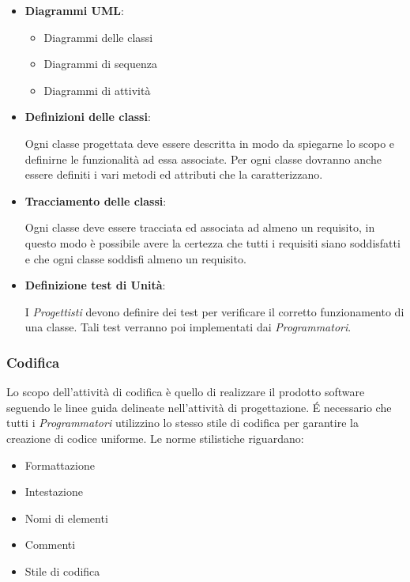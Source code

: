 \begin{itemize}
\item \textbf{Diagrammi UML}:
  \begin{itemize}
  \item Diagrammi delle classi
  \item Diagrammi di sequenza
  \item Diagrammi di attività
  \end{itemize}
\item \textbf{Definizioni delle classi}:

  Ogni classe progettata deve essere descritta in modo da spiegarne lo
  scopo e definirne le funzionalità ad essa associate. Per ogni classe
  dovranno anche essere definiti i vari metodi ed attributi che la
  caratterizzano. 

\item \textbf{Tracciamento delle classi}:

  Ogni classe deve essere tracciata ed associata ad almeno un
  requisito, in questo modo è possibile avere la certezza che tutti i
  requisiti siano soddisfatti e che ogni classe soddisfi almeno un
  requisito.

\item \textbf{Definizione test di Unità}:

I \textit{Progettisti} devono definire dei test per verificare il corretto funzionamento di una classe.
Tali test verranno poi implementati dai \textit{Programmatori}.

\end{itemize}

\subsubsection{Codifica}

Lo scopo dell'attività di codifica è quello di realizzare il prodotto
software seguendo le linee guida delineate nell'attività di
progettazione. 
\'E necessario che tutti i  \emph{Programmatori}  utilizzino lo stesso stile di codifica
per garantire la creazione di codice uniforme. Le norme stilistiche riguardano:
\begin{itemize}
\item Formattazione
\item Intestazione
\item Nomi di elementi
\item Commenti
\item Stile di codifica
\end{itemize}
